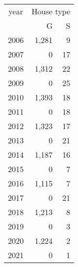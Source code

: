 \footnotesize\begin{tabular}[t]{lrr}
\toprule
\multicolumn{1}{c}{year} & \multicolumn{2}{c}{House type} \\
\cmidrule(l{3pt}r{3pt}){1-1} \cmidrule(l{3pt}r{3pt}){2-3}
  & G & S\\
\midrule
2006 & 1,281 & 9\\
2007 & 0 & 17\\
2008 & 1,312 & 22\\
2009 & 0 & 25\\
2010 & 1,393 & 18\\
2011 & 0 & 18\\
2012 & 1,323 & 17\\
2013 & 0 & 21\\
2014 & 1,187 & 16\\
2015 & 0 & 7\\
2016 & 1,115 & 7\\
2017 & 0 & 21\\
2018 & 1,213 & 8\\
2019 & 0 & 3\\
2020 & 1,224 & 2\\
2021 & 0 & 1\\
\bottomrule
\end{tabular}
